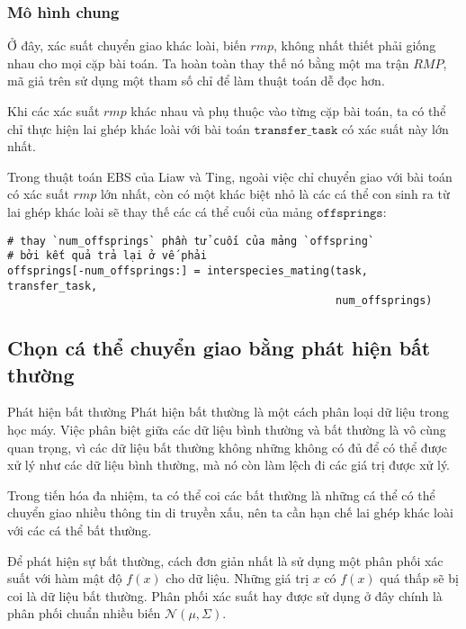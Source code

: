 \begin{frame}[fragile]
\frametitle{Mô hình chung}
Ở đây, xác suất chuyển giao khác loài, biến \( rmp \), không nhất thiết phải
giống nhau cho mọi cặp bài toán. Ta hoàn toàn thay thế nó bằng một ma trận \(
RMP \), mã giả trên sử dụng một tham số chỉ để làm thuật toán dễ đọc hơn.

Khi các xác suất \( rmp \) khác nhau và phụ thuộc vào từng cặp bài toán, ta có
thể chỉ thực hiện lai ghép khác loài với bài toán \( \texttt{transfer\_task}
\) có xác suất này lớn nhất.

Trong thuật toán EBS của Liaw và Ting, ngoài việc chỉ chuyển giao với bài toán
có xác suất \( rmp \) lớn nhất, còn có một khác biệt nhỏ là các cá thể con
sinh ra từ lai ghép khác loài sẽ thay thế các cá thể cuối của mảng \(
\texttt{offsprings} \):
\begin{verbatim}
# thay `num_offsprings` phần tử cuối của mảng `offspring`
# bởi kết quả trả lại ở vế phải
offsprings[-num_offsprings:] = interspecies_mating(task, transfer_task,
                                                   num_offsprings)
\end{verbatim}
\end{frame}

\subsection{Chọn cá thể chuyển giao bằng phát hiện bất thường} %
\label{sub:Chọn cá thể chuyển giao bằng phát hiện bất thường}

\begin{frame}{Phát hiện bất thường}
  Phát hiện bất thường là một cách phân loại dữ liệu trong học máy. Việc phân
  biệt giữa các dữ liệu bình thường và bất thường là vô cùng quan trọng, vì các
  dữ liệu bất thường không những không có đủ để có thể được xử lý như các dữ
  liệu bình thường, mà nó còn làm lệch đi các giá trị được xử lý.

  Trong tiến hóa đa nhiệm, ta có thể coi các bất thường là những cá thể có thể
  chuyển giao nhiều thông tin di truyền xấu, nên ta cần hạn chế lai ghép khác
  loài với các cá thể bất thường.

  Để phát hiện sự bất thường, cách đơn giản nhất là sử dụng một phân phối xác
  suất với hàm mật độ \( f(x) \) cho dữ liệu. Những giá trị \( x \) có \( f(x)
  \) quá thấp sẽ bị coi là dữ liệu bất thường. Phân phối xác suất hay được sử
  dụng ở đây chính là phân phối chuẩn nhiều biến \( \mathcal{N}(\mu, \Sigma) \).
\end{frame}

